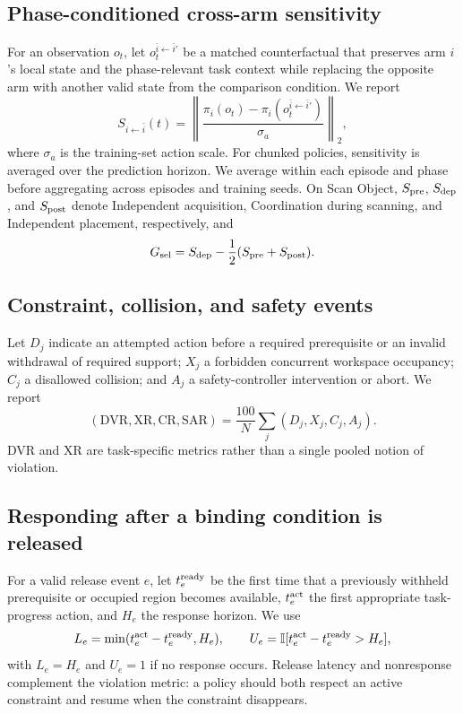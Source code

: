 \subsection{Phase-conditioned cross-arm sensitivity}
For an observation $o_t$, let $o_t^{\bar i\leftarrow \bar i'}$ be a matched counterfactual that preserves arm $i$'s local state and the phase-relevant task context while replacing the opposite arm with another valid state from the comparison condition. We report
\begin{equation}
 S_{i\leftarrow \bar i}(t)=
 \left\|
 \frac{\pi_i(o_t)-\pi_i(o_t^{\bar i\leftarrow \bar i'})}{\sigma_a}
 \right\|_2,
 \label{eq:metrics-sensitivity}
\end{equation}
where $\sigma_a$ is the training-set action scale. For chunked policies, sensitivity is averaged over the prediction horizon. We average within each episode and phase before aggregating across episodes and training seeds. On Scan Object, $S_{\rm pre}$, $S_{\rm dep}$, and $S_{\rm post}$ denote Independent acquisition, Coordination during scanning, and Independent placement, respectively, and
\begin{equation}
 G_{\rm sel}=S_{\rm dep}-\frac{1}{2}(S_{\rm pre}+S_{\rm post}).
 \label{eq:metrics-selectivity}
\end{equation}

\subsection{Constraint, collision, and safety events}
Let $D_j$ indicate an attempted action before a required prerequisite or an invalid withdrawal of required support; $X_j$ a forbidden concurrent workspace occupancy; $C_j$ a disallowed collision; and $A_j$ a safety-controller intervention or abort. We report
\begin{equation}
 (\mathrm{DVR},\mathrm{XR},\mathrm{CR},\mathrm{SAR})
 =\frac{100}{N}\sum_j(D_j,X_j,C_j,A_j).
 \label{eq:metrics-constraint}
\end{equation}
DVR and XR are task-specific metrics rather than a single pooled notion of violation.

\subsection{Responding after a binding condition is released}
For a valid release event $e$, let $t_e^{\rm ready}$ be the first time that a previously withheld prerequisite or occupied region becomes available, $t_e^{\rm act}$ the first appropriate task-progress action, and $H_e$ the response horizon. We use
\begin{equation}
 L_e=\min(t_e^{\rm act}-t_e^{\rm ready},H_e),\qquad
 U_e=\mathbb{I}[t_e^{\rm act}-t_e^{\rm ready}>H_e],
 \label{eq:metrics-release}
\end{equation}
with $L_e=H_e$ and $U_e=1$ if no response occurs. Release latency and nonresponse complement the violation metric: a policy should both respect an active constraint and resume when the constraint disappears.

